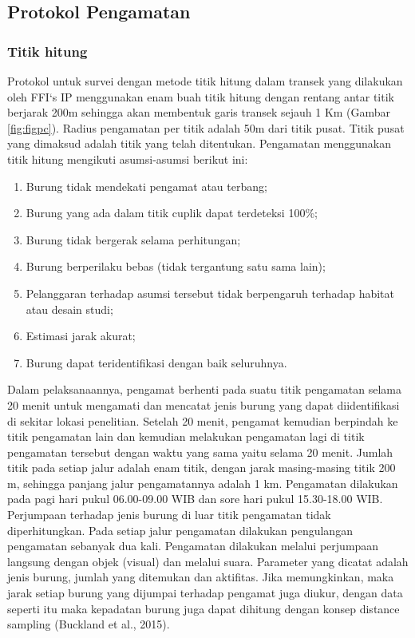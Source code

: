 \documentclass[
  oneside]{book}
\providecommand{\tightlist}{%
  \setlength{\itemsep}{0pt}\setlength{\parskip}{0pt}}
\begin{document}
\hypertarget{protokol-pengamatan}{%
\subsection*{Protokol Pengamatan}\label{protokol-pengamatan}}

\hypertarget{titik-hitung}{%
\subsubsection*{Titik hitung}\label{titik-hitung}}

Protokol untuk survei dengan metode titik hitung dalam transek yang dilakukan oleh FFI`s IP menggunakan enam buah titik hitung dengan rentang antar titik berjarak 200m sehingga akan membentuk garis transek sejauh 1 Km (Gambar \ref{fig:figpc}). Radius pengamatan per titik adalah 50m dari titik pusat. Titik pusat yang dimaksud adalah titik yang telah ditentukan. Pengamatan menggunakan titik hitung mengikuti asumsi-asumsi berikut ini:

\begin{enumerate}
\def\labelenumi{\arabic{enumi}.}
\tightlist
\item
  Burung tidak mendekati pengamat atau terbang;
\item
  Burung yang ada dalam titik cuplik dapat terdeteksi 100\%;
\item
  Burung tidak bergerak selama perhitungan;
\item
  Burung berperilaku bebas (tidak tergantung satu sama lain);
\item
  Pelanggaran terhadap asumsi tersebut tidak berpengaruh terhadap habitat atau desain studi;
\item
  Estimasi jarak akurat;
\item
  Burung dapat teridentifikasi dengan baik seluruhnya.
\end{enumerate}

Dalam pelaksanaannya, pengamat berhenti pada suatu titik pengamatan selama 20 menit untuk mengamati dan mencatat jenis burung yang dapat diidentifikasi di sekitar lokasi penelitian. Setelah 20 menit, pengamat kemudian berpindah ke titik pengamatan lain dan kemudian melakukan pengamatan lagi di titik pengamatan tersebut dengan waktu yang sama yaitu selama 20 menit. Jumlah titik pada setiap jalur adalah enam titik, dengan jarak masing-masing titik 200 m, sehingga panjang jalur pengamatannya adalah 1 km. Pengamatan dilakukan pada pagi hari pukul 06.00-09.00 WIB dan sore hari pukul 15.30-18.00 WIB. Perjumpaan terhadap jenis burung di luar titik pengamatan tidak diperhitungkan. Pada setiap jalur pengamatan dilakukan pengulangan pengamatan sebanyak dua kali. Pengamatan dilakukan melalui perjumpaan langsung dengan objek (visual) dan melalui suara. Parameter yang dicatat adalah jenis burung, jumlah yang ditemukan dan aktifitas. Jika memungkinkan, maka jarak setiap burung yang dijumpai terhadap pengamat juga diukur, dengan data seperti itu maka kepadatan burung juga dapat dihitung dengan konsep distance sampling (Buckland et al., 2015).
\end{document}
